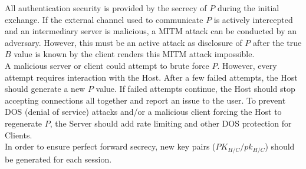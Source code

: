 \documentclass{article}
\begin{document}
    All authentication security is provided by the secrecy of $P$ during the initial
    exchange. If the external channel used to communicate $P$ is actively
    intercepted and an intermediary server is malicious, a MITM attack can be
    conducted by an adversary. However, this must be an active attack as disclosure
    of $P$ after the true $B$ value is known by the client renders this MITM attack
    impossible.\\

    A malicious server or client could attempt to brute force $P$. However, every
    attempt requires interaction with the Host. After a few failed attempts, the
    Host should generate a new $P$ value. If failed attempts continue, the Host
    should stop accepting connections all together and report an issue to the user.
    To prevent DOS (denial of service) attacks and/or a malicious client forcing the
    Host to regenerate $P$, the Server should add rate limiting and other DOS
    protection for Clients.\\

    In order to ensure perfect forward secrecy, new key pairs
    ($PK_{H/C}/pk_{H/C}$) should be generated for each session.
\end{document}
